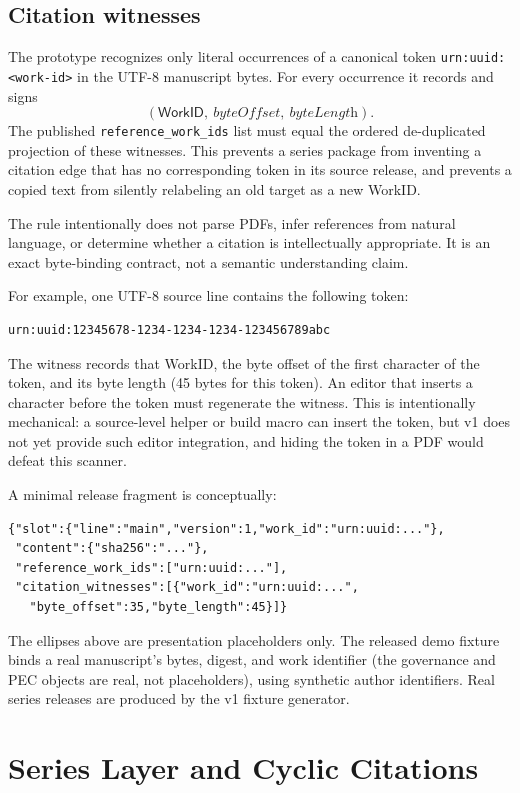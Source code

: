 \documentclass[11pt]{article}
\newcommand{\workid}{\textsf{WorkID}}
\begin{document}
\subsection{Citation witnesses}

The prototype recognizes only literal occurrences of a canonical token \texttt{urn:uuid:<work-id>} in the UTF-8 manuscript bytes. For every occurrence it records and signs
\[
  (\workid,\ \textit{byteOffset},\ \textit{byteLength}).
\]
The published \texttt{reference\_work\_ids} list must equal the ordered de-duplicated projection of these witnesses. This prevents a series package from inventing a citation edge that has no corresponding token in its source release, and prevents a copied text from silently relabeling an old target as a new \workid.

The rule intentionally does not parse PDFs, infer references from natural language, or determine whether a citation is intellectually appropriate. It is an exact byte-binding contract, not a semantic understanding claim.

For example, one UTF-8 source line contains the following token:
\begin{verbatim}
urn:uuid:12345678-1234-1234-1234-123456789abc
\end{verbatim}
The witness records that WorkID, the byte offset of the first character of the
token, and its byte length (45 bytes for this token). An editor that inserts a
character before the token must regenerate the witness. This is intentionally
mechanical: a source-level helper or build macro can insert the token, but v1
does not yet provide such editor integration, and hiding the token in a PDF
would defeat this scanner.

A minimal release fragment is conceptually:
\begin{verbatim}
{"slot":{"line":"main","version":1,"work_id":"urn:uuid:..."},
 "content":{"sha256":"..."},
 "reference_work_ids":["urn:uuid:..."],
 "citation_witnesses":[{"work_id":"urn:uuid:...",
   "byte_offset":35,"byte_length":45}]}
\end{verbatim}
The ellipses above are presentation placeholders only. The released demo
fixture binds a real manuscript's bytes, digest, and work identifier (the
governance and PEC objects are real, not placeholders), using synthetic author
identifiers. Real series releases are produced by the v1 fixture generator.

\section{Series Layer and Cyclic Citations}
\end{document}
